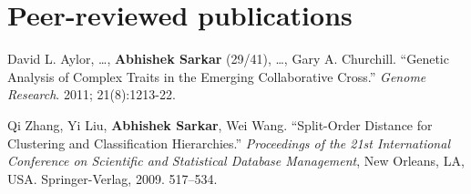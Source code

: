 \documentclass{article}
\begin{document}
\section*{Peer-reviewed publications}
\begin{henum}
\item David L. Aylor, \ldots, \textbf{Abhishek Sarkar} (29/41), \ldots, Gary A.
  Churchill. ``Genetic Analysis of Complex Traits in the Emerging Collaborative
  Cross.'' \emph{Genome Research}. 2011; 21(8):1213-22.

\item Qi Zhang, Yi Liu, \textbf{Abhishek Sarkar}, Wei Wang. ``Split-Order
  Distance for Clustering and Classification Hierarchies.'' \emph{Proceedings
    of the 21st International Conference on Scientific and Statistical Database
    Management}, New Orleans, LA, USA. Springer-Verlag, 2009. 517–534.
\end{henum}
\end{document}
